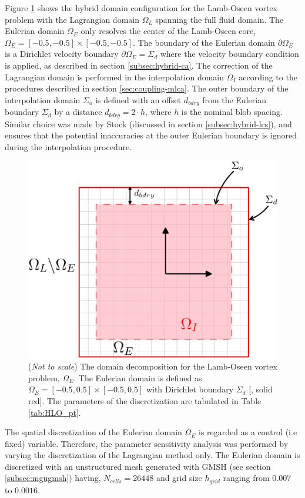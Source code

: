 Figure \ref{fig:HLO_dc} shows the hybrid domain configuration for the Lamb-Oseen vortex problem with the Lagrangian domain $\Omega_L$ spanning the full fluid domain. The Eulerian domain $\Omega_E$ only resolves the center of the Lamb-Oseen core, $\Omega_E = [-0.5,-0.5] \times [-0.5,-0.5]$. The boundary of the Eulerian domain $\partial \Omega_E$ is a Dirichlet velocity boundary $\partial \Omega_E = \Sigma_d$ where the velocity boundary condition is applied, as described in section \ref{subsec:hybrid-ca}. The correction of the Lagrangian domain is performed in the interpolation domain $\Omega_{I}$ according to the procedures described in section \ref{sec:coupling-mlca}. The outer boundary of the interpolation domain $\Sigma_{o}$ is defined with an offset $d_{bdry}$ from the Eulerian boundary $\Sigma_d$ by a distance $d_{bdry} = 2\cdot h$, where $h$ is the nominal blob spacing. Similar choice was made by Stock \cite{Stock2010a} (discussed in section \ref{subsec:hybrid-lcs}), and ensures that the potential inaccuracies at the outer Eulerian boundary is ignored during the interpolation procedure.

	\begin{figure}[!b]
	\centering
	\includegraphics[width=0.5\linewidth]{./figures/validation/lambOseen/hlo_dd-crop.pdf}
	\caption{(\textit{Not to scale}) The domain decomposition for the Lamb-Oseen vortex problem, $\Omega_E$. The Eulerian domain is defined as $\Omega_E = [-0.5,0.5]\times[-0.5,0.5]$ with Dirichlet boundary $\Sigma_d$ [{\color{plotRed}{---}}, solid red]. The parameters of the discretization are tabulated in Table \ref{tab:HLO_pt}.}
	\label{fig:HLO_dc}
	\end{figure}

The spatial discretization of the Eulerian domain $\Omega_E$ is regarded as a control (i.e fixed) variable. Therefore, the parameter sensitivity analysis was performed by varying the discretization of the Lagrangian method only. The Eulerian domain is discretized with an unstructured mesh generated with GMSH (see section \ref{subsec:mgugmsh}) having, $N_{cells} = 26448$  and grid size $h_{grid}$ ranging from $0.007$ to $0.0016$. 

